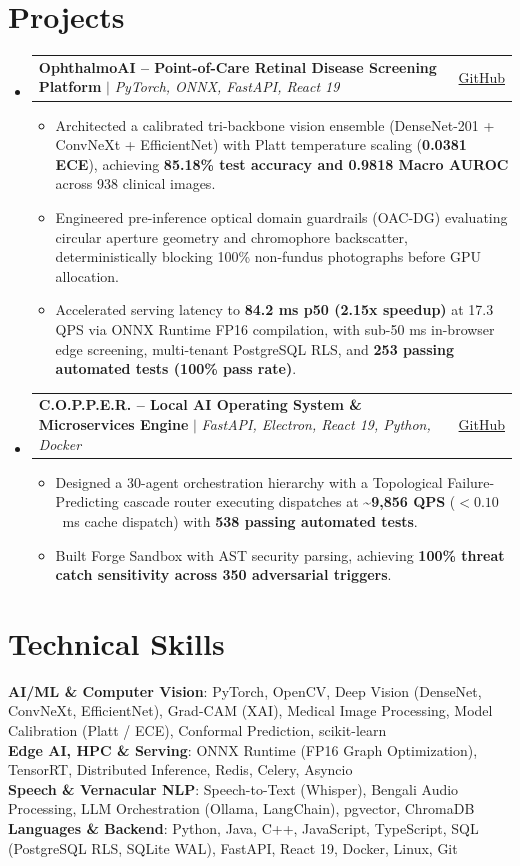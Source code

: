 \documentclass[letterpaper,10pt]{article}
\makeatletter
\newcommand{\resumeItem}[1]{
  \item\small{
    {#1 \vspace{-2pt}}
  }
}
\newcommand{\resumeProjectHeading}[2]{
    \vspace{-1pt}\item
    \begin{tabular*}{0.97\textwidth}{l@{\extracolsep{\fill}}r}
      \small#1 & #2 \\
    \end{tabular*}\vspace{-5pt}
}
\newcommand{\resumeSubHeadingListStart}{\begin{itemize}[leftmargin=0.15in, label={}]}
\newcommand{\resumeSubHeadingListEnd}{\end{itemize}}
\newcommand{\resumeItemListStart}{\begin{itemize}[leftmargin=0.15in]}
\newcommand{\resumeItemListEnd}{\end{itemize}\vspace{-4pt}}
\makeatother
\begin{document}
\section{Projects}
  \resumeSubHeadingListStart
    \resumeProjectHeading
      {\textbf{OphthalmoAI -- Point-of-Care Retinal Disease Screening Platform} $|$ \emph{PyTorch, ONNX, FastAPI, React 19}}{\href{https://github.com/AkashKundu114/OphthalmoAI}{GitHub}}
      \resumeItemListStart
        \resumeItem{Architected a calibrated tri-backbone vision ensemble (DenseNet-201 + ConvNeXt + EfficientNet) with Platt temperature scaling (\textbf{0.0381 ECE}), achieving \textbf{85.18\% test accuracy and 0.9818 Macro AUROC} across 938 clinical images.}
        \resumeItem{Engineered pre-inference optical domain guardrails (OAC-DG) evaluating circular aperture geometry and chromophore backscatter, deterministically blocking 100\% non-fundus photographs before GPU allocation.}
        \resumeItem{Accelerated serving latency to \textbf{84.2 ms p50 (2.15x speedup)} at 17.3 QPS via ONNX Runtime FP16 compilation, with sub-50 ms in-browser edge screening, multi-tenant PostgreSQL RLS, and \textbf{253 passing automated tests (100\% pass rate)}.}
      \resumeItemListEnd

    \resumeProjectHeading
      {\textbf{C.O.P.P.E.R. -- Local AI Operating System \& Microservices Engine} $|$ \emph{FastAPI, Electron, React 19, Python, Docker}}{\href{https://github.com/AkashKundu114/COPPER}{GitHub}}
      \resumeItemListStart
        \resumeItem{Designed a 30-agent orchestration hierarchy with a Topological Failure-Predicting cascade router executing dispatches at \textbf{\textasciitilde 9,856 QPS} ($<0.10$~ms cache dispatch) with \textbf{538 passing automated tests}.}
        \resumeItem{Built Forge Sandbox with AST security parsing, achieving \textbf{100\% threat catch sensitivity across 350 adversarial triggers}.}
      \resumeItemListEnd
  \resumeSubHeadingListEnd

\section{Technical Skills}
 \begin{itemize}[leftmargin=0.15in, label={}]
    \small{\item{
     \textbf{AI/ML \& Computer Vision}{: PyTorch, OpenCV, Deep Vision (DenseNet, ConvNeXt, EfficientNet), Grad-CAM (XAI), Medical Image Processing, Model Calibration (Platt / ECE), Conformal Prediction, scikit-learn} \\
     \textbf{Edge AI, HPC \& Serving}{: ONNX Runtime (FP16 Graph Optimization), TensorRT, Distributed Inference, Redis, Celery, Asyncio} \\
     \textbf{Speech \& Vernacular NLP}{: Speech-to-Text (Whisper), Bengali Audio Processing, LLM Orchestration (Ollama, LangChain), pgvector, ChromaDB} \\
     \textbf{Languages \& Backend}{: Python, Java, C++, JavaScript, TypeScript, SQL (PostgreSQL RLS, SQLite WAL), FastAPI, React 19, Docker, Linux, Git}
    }}
 \end{itemize}
\end{document}
